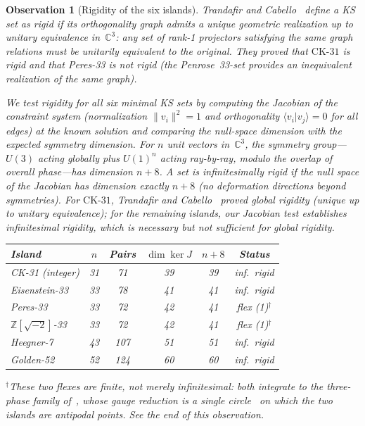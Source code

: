 \documentclass[12pt,a4paper]{article}
\newtheorem{observation}[theorem]{Observation}
\newcommand{\C}{\mathbb{C}}
\newcommand{\Z}{\mathbb{Z}}
\newcommand{\braket}[2]{\langle#1|#2\rangle}
\newcommand{\CK}{\mathrm{CK}\text{-}31}
\begin{document}
\begin{observation}[Rigidity of the six islands]\label{obs:rigidity}
Trandafir and Cabello~\cite{TrandafirCabello2025} define a KS set as \emph{rigid} if its orthogonality graph admits a unique geometric realization up to unitary equivalence in~$\C^3$: any set of rank-1 projectors satisfying the same graph relations must be unitarily equivalent to the original.  They proved that $\CK$ is rigid and that Peres-33 is not rigid (the Penrose~33-set provides an inequivalent realization of the same graph).

We test rigidity for all six minimal KS sets by computing the Jacobian of the constraint system (normalization $\|v_i\|^2 = 1$ and orthogonality $\braket{v_i}{v_j} = 0$ for all edges) at the known solution and comparing the null-space dimension with the expected symmetry dimension.  For $n$ unit vectors in~$\C^3$, the symmetry group---$U(3)$ acting globally plus $U(1)^n$ acting ray-by-ray, modulo the overlap of overall phase---has dimension $n + 8$.  A set is \emph{infinitesimally rigid} if the null space of the Jacobian has dimension exactly $n + 8$ (no deformation directions beyond symmetries).  For $\CK$, Trandafir and Cabello~\cite{TrandafirCabello2025} proved \emph{global} rigidity (unique up to unitary equivalence); for the remaining islands, our Jacobian test establishes infinitesimal rigidity, which is necessary but not sufficient for global rigidity.

\medskip
\begin{center}
\renewcommand{\arraystretch}{1.1}
\begin{tabular}{lccccc}
\hline
Island & $n$ & Pairs & $\dim\ker J$ & $n{+}8$ & Status \\
\hline
CK-31 (integer)   & 31 & 71  & 39 & 39 & inf.\ rigid \\
Eisenstein-33      & 33 & 78  & 41 & 41 & inf.\ rigid \\
Peres-33           & 33 & 72  & 42 & 41 & flex (1)$^\dagger$ \\
$\Z[\sqrt{-2}]$-33 & 33 & 72 & 42 & 41 & flex (1)$^\dagger$ \\
Heegner-7          & 43 & 107 & 51 & 51 & inf.\ rigid \\
Golden-52          & 52 & 124 & 60 & 60 & inf.\ rigid \\
\hline
\end{tabular}
\end{center}

\smallskip\noindent$^\dagger$These two flexes are \emph{finite}, not merely infinitesimal: both integrate to the three-phase family of~\cite{GouldAravind2010}, whose gauge reduction is a single circle~\cite{FloresGordillo2026} on which the two islands are antipodal points.  See the end of this observation.
\medskip


\end{observation}
\end{document}
